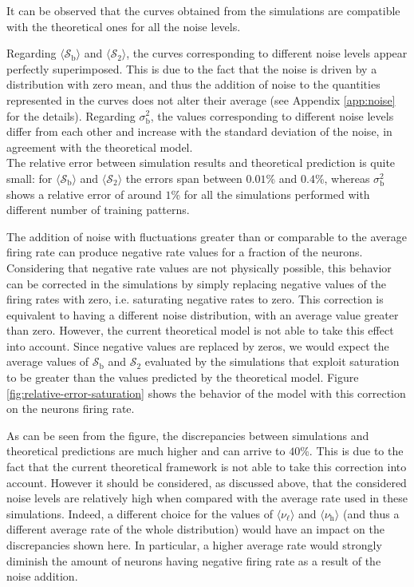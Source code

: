\documentclass[a4paper, 12pt, twoside, openright]{book}
\newcommand{\rh}{\nu_\text{h}}
\newcommand{\rl}{\nu_{\ell}}
\newcommand{\SII}{\mathcal{S}_\text{2}}
\newcommand{\Sb}{\mathcal{S}_\text{b}}
\newcommand{\varSb}{\sigma^{2}_\text{b}}
\begin{document}
It can be observed that the curves obtained from the simulations are compatible with the theoretical ones for all the noise levels.


Regarding $\langle\Sb\rangle$ and $\langle\SII\rangle$, the curves corresponding to different noise levels appear perfectly superimposed.
This is due to the fact that the noise is driven by a distribution with zero mean, and thus the addition of noise to the quantities represented in the curves does not alter their average (see Appendix \ref{app:noise} for the details). Regarding $\varSb$, the values corresponding to
different noise levels
differ from each other and increase with the standard deviation of the noise, in agreement with the theoretical model.\\
The relative error between simulation results and theoretical prediction is quite small: for $\langle\Sb\rangle$ and $\langle\SII\rangle$ the errors span between $0.01$\% and $0.4$\%, whereas $\varSb$ shows a relative error of around $1$\% for all the simulations performed with different number of training patterns.


The addition of noise with fluctuations greater than or comparable to the average firing rate can
produce negative rate values for a fraction of the neurons.
Considering that negative rate values are not physically possible, this behavior can be corrected in the simulations by simply  replacing negative values of the firing rates with zero, i.e. saturating negative rates
to zero.
This correction is equivalent to having a different noise distribution, with an average value greater than zero.
However, the current theoretical model is not able to take this effect into account. Since negative values are replaced by zeros,
we would expect the average values of $\Sb$ and $\SII$ evaluated by the simulations that exploit saturation to be greater than the values
predicted by the theoretical model.
Figure \ref{fig:relative-error-saturation} shows the behavior of the model with this correction on the neurons firing rate.



As can be seen from the figure, the discrepancies between simulations and theoretical predictions are much higher and can arrive to $40$\%. This is due to the fact that the current theoretical framework is not able to take this correction into account.
However it should be considered, as discussed above, that the considered noise levels are relatively high when compared with the average rate used in these simulations.
Indeed, a different choice for the values of $\langle \rl \rangle$ and $\langle \rh \rangle$ (and thus a different average rate of the whole distribution) would have an impact on the discrepancies shown here.
In particular, a higher average rate would strongly diminish the amount of neurons having
negative firing rate as a result of the noise addition.
\end{document}
